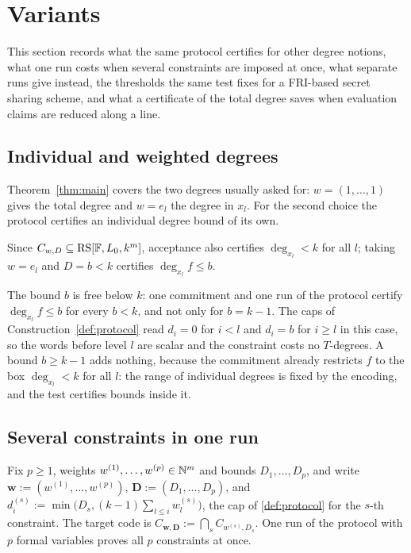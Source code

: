 \section{Variants}\label{sec:variants}

This section records what the same protocol certifies for other degree notions, what one run
costs when several constraints are imposed at once, what separate runs give instead, the
thresholds the same test fixes for a FRI-based secret sharing scheme, and what a certificate of
the total degree saves when evaluation claims are reduced along a line.

\subsection{Individual and weighted degrees}\label{sec:individual}

Theorem~\ref{thm:main} covers the two degrees usually asked for: $w=(1,\dots,1)$ gives the
total degree and $w=e_l$ the degree in $x_l$. For the second choice the protocol certifies an
individual degree bound of its own.

\begin{remark}
Since $C_{w,D}\subseteq\mathrm{RS}[\mathbb{F},L_0,k^m]$, acceptance also certifies
$\deg_{x_l}<k$ for all $l$; taking $w=e_l$ and $D=b<k$ certifies $\deg_{x_l}f\le b$.
\end{remark}

The bound $b$ is free below $k$: one commitment and one run of the protocol certify
$\deg_{x_l}f\le b$ for every $b<k$, and not only for $b=k-1$. The caps of
Construction~\ref{def:protocol} read $d_i=0$ for $i<l$ and $d_i=b$ for $i\ge l$ in this case, so the
words before level $l$ are scalar and the constraint costs no $T$-degrees. A bound $b\ge k-1$ adds nothing, because the commitment already restricts $f$ to the box
$\deg_{x_l}<k$ for all $l$: the range of individual degrees is fixed by the encoding, and the
test certifies bounds inside it.

\subsection{Several constraints in one run}\label{sec:multi}

Fix $p\ge1$, weights $w^{(1)},\dots,w^{(p)}\in\mathbb{N}^m$ and bounds $D_1,\dots,D_p$, and
write $\mathbf w:=(w^{(1)},\dots,w^{(p)})$, $\mathbf D:=(D_1,\dots,D_p)$, and
$d^{(s)}_i:=\min\big(D_s,(k-1)\sum_{l\le i}w^{(s)}_l\big)$, the cap of \cref{def:protocol}
for the $s$-th constraint. The target code is
$C_{\mathbf w,\mathbf D}:=\bigcap_sC_{w^{(s)},D_s}$. One run of the protocol with $p$ formal
variables proves all $p$ constraints at once.


